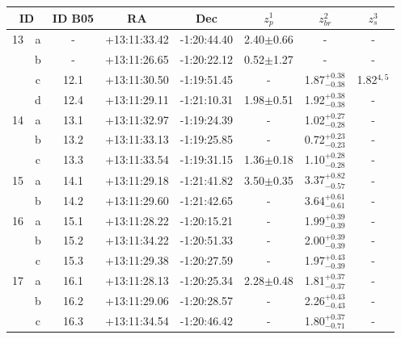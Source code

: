 \documentclass[useAMS,usenatbib]{mn2e}
\begin{document}
\begin{table}
  \centering
  \begin{tabular}{cccccccc}
    \hline
    \multicolumn{2}{c}{ID} & ID B05 & RA & Dec & $z_p^1$ & $z_{br}^2$ & $z_s^3$ \\
    \hline
    \hline
       13 & a &   -  & +13:11:33.42 & -1:20:44.40 & 2.40$\pm$0.66 &          -             &       -      \\
          & b &   -  & +13:11:26.65 & -1:20:22.12 & 0.52$\pm$1.27 &          -             &       -      \\
          & c & 12.1 & +13:11:30.50 & -1:19:51.45 &      -        & 1.87$^{+0.38}_{-0.38}$ & 1.82$^{4,5}$ \\
          & d & 12.4 & +13:11:29.11 & -1:21:10.31 & 1.98$\pm$0.51 & 1.92$^{+0.38}_{-0.38}$ &       -      \\
     \hline							    		    	    				
       14 & a & 13.1 & +13:11:32.97 & -1:19:24.39 &      -        & 1.02$^{+0.27}_{-0.28}$ &       -      \\
          & b & 13.2 & +13:11:33.13 & -1:19:25.85 &      -        & 0.72$^{+0.23}_{-0.23}$ &       -      \\
          & c & 13.3 & +13:11:33.54 & -1:19:31.15 & 1.36$\pm$0.18 & 1.10$^{+0.28}_{-0.28}$ &       -      \\
     \hline							    		    	    				
       15 & a & 14.1 & +13:11:29.18 & -1:21:41.82 & 3.50$\pm$0.35 & 3.37$^{+0.82}_{-0.57}$ &       -      \\
          & b & 14.2 & +13:11:29.60 & -1:21:42.65 &      -        & 3.64$^{+0.61}_{-0.61}$ &       -      \\
     \hline							    		    	    				
       16 & a & 15.1 & +13:11:28.22 & -1:20:15.21 &      -        & 1.99$^{+0.39}_{-0.39}$ &       -      \\
          & b & 15.2 & +13:11:34.22 & -1:20:51.33 &      -        & 2.00$^{+0.39}_{-0.39}$ &       -      \\
          & c & 15.3 & +13:11:29.38 & -1:20:27.59 &      -        & 1.97$^{+0.43}_{-0.39}$ &       -      \\
     \hline							    		    	    				
       17 & a & 16.1 & +13:11:28.13 & -1:20:25.34 & 2.28$\pm$0.48 & 1.81$^{+0.37}_{-0.37}$ &       -      \\
          & b & 16.2 & +13:11:29.06 & -1:20:28.57 &      -        & 2.26$^{+0.43}_{-0.43}$ &       -      \\
          & c & 16.3 & +13:11:34.54 & -1:20:46.42 &      -        & 1.80$^{+0.37}_{-0.71}$ &       -      \\

\end{tabular}
\end{table}
\end{document}
